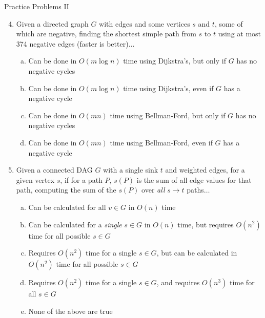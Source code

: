 \documentclass{beamer}
\begin{document}
\begin{frame}[t]{Practice Problems II}
    \begin{enumerate}
        \setcounter{enumi}{3}
        \item Given a directed graph $G$ with edges and some vertices $s$ and $t$, some of which are negative, finding the shortest simple path from $s$ to $t$ using at most 374 negative edges (faster is better)$\dotsc$
        \begin{enumerate} [(a)]
            \item Can be done in $O(m \log n)$ time using Dijkstra's, but only if $G$ has no negative cycles %
            \item Can be done in $O(m \log n)$ time using Dijkstra's, even if $G$ has a negative cycle
            \item Can be done in $O(m n)$ time using Bellman-Ford, but only if $G$ has no negative cycles
            \item Can be done in $O(m n)$ time using Bellman-Ford, even if $G$ has a negative cycle
        \end{enumerate}
        \pause \item Given a connected DAG $G$ with a single sink $t$ and weighted edges, for a given vertex $s$, if for a path $P$, $s(P)$ is the sum of all edge values for that path, computing the sum of the $s(P)$ over \textit{all} $s \rightarrow t$ paths$\dotsc$
        \begin{enumerate}[(a)]
            \item Can be calculated for all $v\in G$ in $O(n)$ time
            \item Can be calculated for a \textit{single} $s\in G$ in $O(n)$ time, but requires $O(n^2)$ time for all possible $s\in G$
            \item Requires $O(n^2)$ time for a single $s\in G$, but can be calculated in $O(n^2)$ time for all possible $s\in G$
            \item Requires $O(n^2)$ time for a single $s\in G$, and requires $O(n^3)$ time for all $s\in G$
            \item None of the above are true
        \end{enumerate}
    \end{enumerate}
\end{frame}
\end{document}
